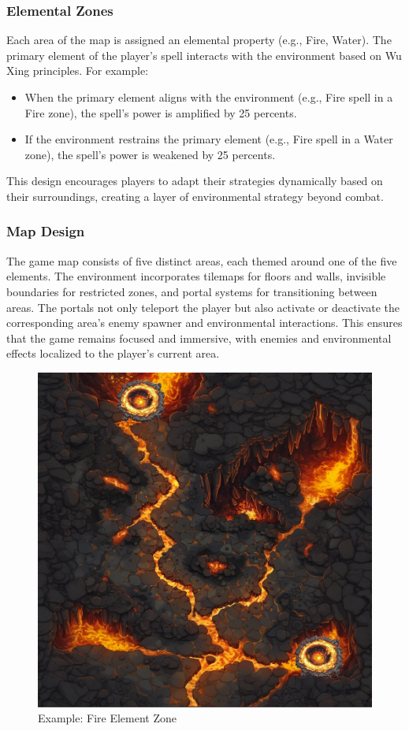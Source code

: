 \documentclass[10pt,twocolumn]{article}
\begin{document}
\subsubsection{Elemental Zones}
Each area of the map is assigned an elemental property (e.g., Fire, Water). The primary element of the player's spell interacts with the environment based on Wu Xing principles. For example:
\begin{itemize}
    \item When the primary element aligns with the environment (e.g., Fire spell in a Fire zone), the spell's power is amplified by 25 percents.
    \item If the environment restrains the primary element (e.g., Fire spell in a Water zone), the spell's power is weakened by 25 percents.
\end{itemize}
This design encourages players to adapt their strategies dynamically based on their surroundings, creating a layer of environmental strategy beyond combat.

\subsubsection{Map Design}
The game map consists of five distinct areas, each themed around one of the five elements. The environment incorporates tilemaps for floors and walls, invisible boundaries for restricted zones, and portal systems for transitioning between areas. The portals not only teleport the player but also activate or deactivate the corresponding area’s enemy spawner and environmental interactions. This ensures that the game remains focused and immersive, with enemies and environmental effects localized to the player's current area.

\begin{figure}[h]
    \centering
    \includegraphics[width=\columnwidth]{figure2.png} %
    \caption{Example: Fire Element Zone}
    \label{fig:figure2} %
\end{figure}
\end{document}
